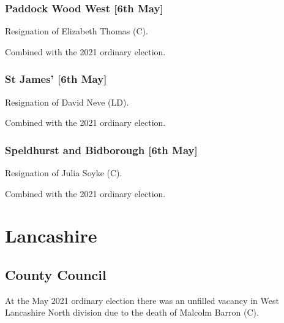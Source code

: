 \documentclass[a4paper,openany]{book}
\begin{document}
\begin{resultsiii}
\subsubsection*{Paddock Wood West \hspace*{\fill}\nolinebreak[1]%
	\enspace\hspace*{\fill}
	[6th May]}


Resignation of Elizabeth Thomas (C).

Combined with the 2021 ordinary election.

\subsubsection*{St James' \hspace*{\fill}\nolinebreak[1]%
	\enspace\hspace*{\fill}
	[6th May]}


Resignation of David Neve (LD).

Combined with the 2021 ordinary election.

\subsubsection*{Speldhurst and Bidborough \hspace*{\fill}\nolinebreak[1]%
	\enspace\hspace*{\fill}
	[6th May]}


Resignation of Julia Soyke (C).

Combined with the 2021 ordinary election.

\section{Lancashire}

\subsection*{County Council}

At the May 2021 ordinary election there was an unfilled vacancy in West Lancashire North division due to the death of Malcolm Barron (C).


\end{resultsiii}
\end{document}
